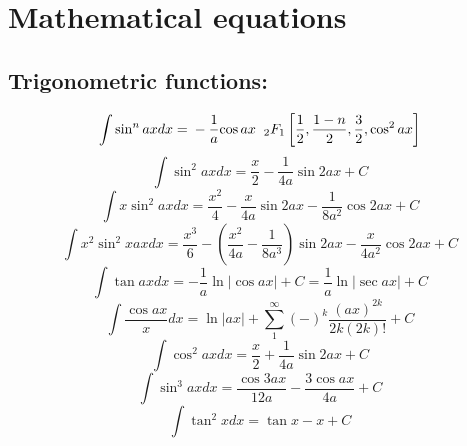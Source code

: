 \documentclass[12pt,a4paper]{article}
\begin{document}
	
	
	
	
	
	
	
	
	
	
	
	
	
	
	
	
	
	
	
		\section*{Mathematical equations}
		\subsection*{Trigonometric functions:}
		\begin{equation}
	\int \sin^n ax dx =
	\nonumber \\ 
	-\frac{1}{a}{\cos ax} \hspace{2mm}{_2F_1}\left[
	\frac{1}{2}, \frac{1-n}{2}, \frac{3}{2}, \cos^2 ax
	\right]
\end{equation}
		\begin{equation}
		\int \sin ^2 ax dx = \frac{x}{2} - \frac{1}{4a} \sin 2ax + C
	\end{equation}
	\begin{equation}
		\int x \sin ^2 ax dx = \frac{x^2}{4} - \frac{x}{4a} \sin 2ax - \frac{1}{8a^2} \cos 2ax + C
	\end{equation}
	\begin{equation}
		\int x^2 \sin^2 x ax dx = \frac{x^3}{6} - (\frac{x^2}{4a} - \frac{1}{8a^3})\sin 2ax - \frac{x}{4a^2} \cos 2ax +C
	\end{equation}
	\begin{equation}
		\int \tan ax dx = - \frac{1}{a} \ln |\cos ax| + C = \frac{1}{a} \ln |\sec ax | +C
	\end{equation}
	\begin{equation}
		\int \frac{\cos ax}{x} dx = \ln |ax| + \sum_{1}^{\infty} (-)^k \frac{(ax)^{2k}}{2k (2k)!} +C
	\end{equation}
	\begin{equation}
		\int \cos ^2 ax dx = \frac{x}{2} + \frac{1}{4a} \sin 2ax + C
	\end{equation}
	\begin{equation}
		\int \sin^3 ax dx = \frac{\cos 3ax}{12a} - \frac{3 \cos ax}{4a} + C
	\end{equation}
	\begin{equation}
		\int \tan^2 x dx = \tan x -x +C
	\end{equation}
\end{document}
